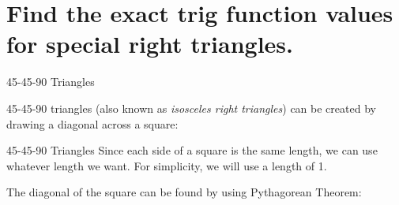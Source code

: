 \documentclass[t]{beamer}
\begin{document}
\section{Find the exact trig function values for special right triangles.}

\begin{frame}{45-45-90 Triangles}

45-45-90 triangles (also known as \textit{isosceles right triangles}) can be created by drawing a diagonal across a square:

\begin{center}
\end{center}

\end{frame} 

\begin{frame}{45-45-90 Triangles}
Since each side of a square is the same length, we can use whatever length we want. For simplicity, we will use a length of 1.  \newline\\ \pause

The diagonal of the square can be found by using Pythagorean Theorem:  \pause

\begin{center}
\end{center}
\end{frame}
\end{document}

